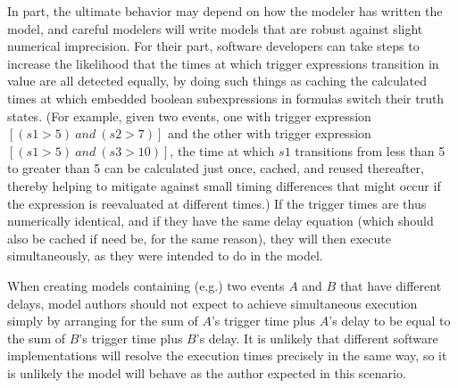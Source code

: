 In part, the ultimate behavior may depend on how the modeler has
written the model, and careful modelers will write models that are
robust against slight numerical imprecision.  For their part,
software developers can take steps to increase the likelihood that
the times at which trigger expressions transition in value are all
detected equally, by doing such things as caching the calculated
times at which embedded boolean subexpressions in \Trigger
formulas switch their truth states.  (For example, given two
events, one with trigger expression $[(s1 > 5)\ and\ (s2 > 7)]$
and the other with trigger expression $[(s1 > 5)\ and\ (s3 >
10)]$, the time at which $s1$ transitions from less than 5 to
greater than 5 can be calculated just once, cached, and reused
thereafter, thereby helping to mitigate against small timing
differences that might occur if the expression is reevaluated at
different times.)  If the trigger times are thus numerically
identical, and if they have the same delay equation (which should
also be cached if need be, for the same reason), they will then
execute simultaneously, as they were intended to do in the model.

When creating models containing (e.g.) two events $A$ and $B$ that
have different delays, model authors should not expect to achieve
simultaneous execution simply by arranging for the sum of $A$'s
trigger time plus $A$'s delay to be equal to the sum of $B$'s
trigger time plus $B$'s delay.  It is unlikely that different
software implementations will resolve the execution times
precisely in the same way, so it is unlikely the model will behave
as the author expected in this scenario.

